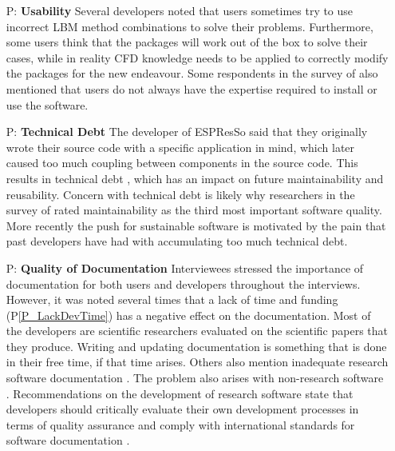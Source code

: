 \documentclass[final, 3p, times, authoryear]{elsarticle}
\newcounter{pnum} %
\newcommand{\ppref}[1]{P\ref{#1}}
\begin{document}
\begin{enumerate}
	\item[P\refstepcounter{pnum}\thepnum \label{P_Usability}:]
	\textbf{Usability} Several developers noted that users sometimes try to use
	incorrect LBM method combinations to solve their problems. Furthermore, some
	users think that the packages will work out of the box to solve their cases,
	while in reality CFD knowledge needs to be applied to correctly modify the
	packages for the new endeavour.  Some respondents in the survey of
	\citet{WieseEtAl2019} also mentioned that users do not always have the
	expertise required to install or use the software.
	
	\item[P\refstepcounter{pnum}\thepnum \label{P_TechDebt}:] \textbf{Technical
	Debt} The developer of ESPResSo said that they originally wrote their source
	code with a specific application in mind, which later caused too much
	coupling between components in the source code. This results in technical
	debt \citep{KruchtenEtAl2012}, which has an impact on future maintainability
	and reusability. Concern with technical debt is likely why researchers in
	the survey of \citet{Nguyen-HoanEtAl2010} rated maintainability as the third
	most important software quality. More recently the push for sustainable
	software \citep{deSouzaEtAl2019} is motivated by the pain that past
	developers have had with accumulating too much technical debt.

	\item[P\refstepcounter{pnum}\thepnum \label{P_Documentation}:]
	\textbf{Quality of Documentation}  Interviewees stressed the importance of
	documentation for both users and developers throughout the interviews.
	However, it was noted several times that a lack of time and funding
	(\ppref{P_LackDevTime}) has a negative effect on the documentation. Most of
	the developers are scientific researchers evaluated on the scientific papers
	that they produce. Writing and updating documentation is something that is
	done in their free time, if that time arises. Others also mention inadequate
	research software documentation \citep{PintoEtAl2018, WieseEtAl2019}.  The
	problem also arises with non-research software \citep{LethbridgeEtAl2003}.
	Recommendations on the development of research software state that
	developers should critically evaluate their own development processes in
	terms of quality assurance and comply with international standards for
	software documentation \citep{KaterbowAndFeulner2018}.

\end{enumerate}
\end{document}
